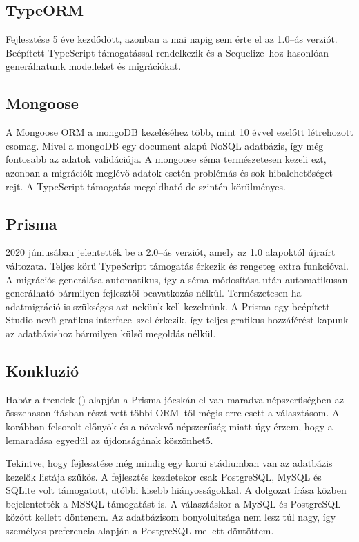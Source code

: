 \subsection{TypeORM}
Fejlesztése 5 éve kezdődött, azonban a mai napig sem érte el az 1.0–ás verziót.
Beépített TypeScript támogatással rendelkezik és a Sequelize–hoz hasonlóan generálhatunk modelleket és migrációkat.\cite{TypeORM}


\subsection{Mongoose}
A Mongoose ORM a mongoDB kezeléséhez több, mint 10 évvel ezelőtt létrehozott csomag. 
Mivel a mongoDB egy document alapú NoSQL adatbázis, így még fontosabb az adatok validációja.\cite{Mongoose}
A mongoose séma természetesen kezeli ezt, azonban a migrációk meglévő adatok esetén problémás és sok hibalehetőséget rejt.
A TypeScript támogatás megoldható de szintén körülményes.

\subsection{Prisma}
2020 júniusában jelentették be a 2.0–ás verziót, amely az 1.0 alapoktól újraírt változata.
Teljes körű TypeScript támogatás érkezik és rengeteg extra funkcióval.
A migrációs generálása automatikus, így a séma módosítása után automatikusan generálható bármilyen fejlesztői beavatkozás nélkül.
Természetesen ha adatmigráció is szükséges azt nekünk kell kezelnünk.
A Prisma egy beépített Studio nevű grafikus interface–szel érkezik, így teljes grafikus hozzáférést kapunk az adatbázishoz bármilyen külső megoldás nélkül.


\subsection{Konkluzió}
Habár a trendek () alapján a Prisma jócskán el van maradva népszerűségben az összehasonlításban részt vett többi ORM–től mégis erre esett a választásom.
A korábban felsorolt előnyök és a növekvő népszerűség miatt úgy érzem, hogy a lemaradása egyedül az újdonságának köszönhető.

Tekintve, hogy fejlesztése még mindig egy korai stádiumban van az adatbázis kezelők listája szűkös.
A fejlesztés kezdetekor csak PostgreSQL, MySQL és SQLite volt támogatott, utóbbi kisebb hiányosságokkal.
A dolgozat írása közben bejelentették a MSSQL támogatást is. 
A választáskor a MySQL és PostgreSQL között kellett döntenem.
Az adatbázisom bonyolultsága nem lesz túl nagy, így személyes preferencia alapján a PostgreSQL mellett döntöttem.

